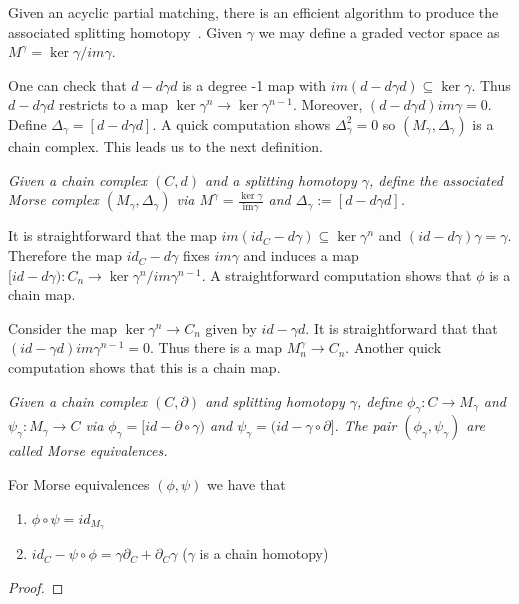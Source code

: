 Given an acyclic partial matching, there is an efficient algorithm to produce the associated splitting homotopy~\cite[Algorithm 3.12 (Gamma Algorithm)]{focm}.  Given $\gamma$ we may define a graded vector space as $M^\gamma = \ker\gamma/ im \gamma$.  

One can check that $d-d\gamma d$ is a degree -1 map with $im(d-d\gamma d)\subseteq \ker \gamma$.  Thus $d-d\gamma d$ restricts to a map $\ker\gamma^n \to \ker\gamma^{n-1}$. Moreover, $(d-d\gamma d)im\gamma= 0$.  Define $\Delta_\gamma=[d - d\gamma d]$.  A quick computation shows $\Delta_\gamma^2 = 0$ so $(M_\gamma,\Delta_\gamma)$ is a chain complex.  This leads us to the next definition.

\begin{defn}
{\em
Given a chain complex $(C,d)$ and a splitting homotopy $\gamma$, define the {\em associated Morse complex} $(M_\gamma,\Delta_\gamma)$ via $M^\gamma=\frac{\ker \gamma}{\text{im} \gamma}$ and $\Delta_\gamma:= [d - d\gamma d]$. 
}
\end{defn}

It is straightforward that the map $im(id_C-d\gamma)\subseteq \ker \gamma^n$ and $(id-d\gamma)\gamma = \gamma$.  Therefore the map $id_C-d\gamma$ fixes $im\gamma$ and induces a map $[id-d\gamma):C_n\to \ker\gamma^n/im\gamma^{n-1}$.  A straightforward computation shows that $\phi$ is a chain map.

Consider the map $\ker\gamma^n \to C_n$ given by $id-\gamma d$.  It is straightforward that that $(id-\gamma d)im\gamma^{n-1}=0$.  Thus there is a map $M^\gamma_n\to C_n$.  Another quick computation shows that this is a chain map.

\begin{defn}
{\em
Given a chain complex $(C,\partial)$ and splitting homotopy $\gamma$, define $\phi_\gamma :C\to M_\gamma$ and $\psi_\gamma :M_\gamma \to C$ via $\phi_\gamma =[id - \partial \circ \gamma)$ and $\psi_\gamma = (id - \gamma\circ \partial]$. The pair $(\phi_\gamma,\psi_\gamma)$ are called {\em Morse equivalences}.
}
\end{defn}



\begin{prop}\label{prop:MorseEquiv}
For Morse equivalences $(\phi,\psi)$ we have that 
\begin{enumerate}
\item $\phi\circ \psi = id_{M_\gamma}$
\item $id_C - \psi\circ \phi = \gamma\partial_C + \partial_C \gamma$ ($\gamma$ is a chain homotopy)
\end{enumerate}
\end{prop}
\begin{proof}

\end{proof}

